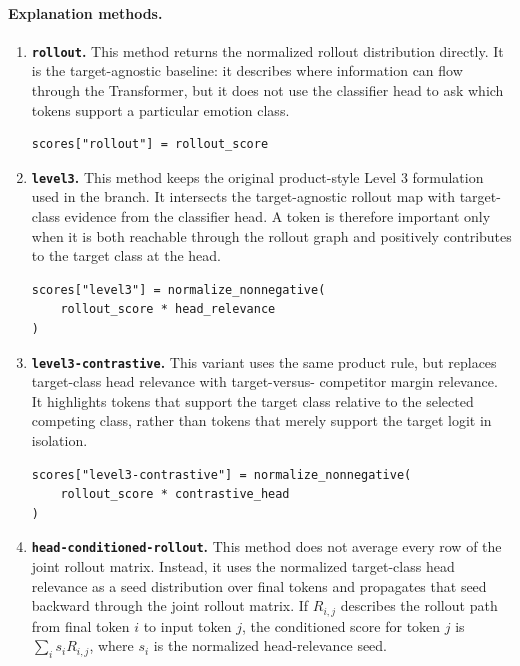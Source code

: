 \documentclass[11pt]{article}
\begin{document}
\paragraph{Explanation methods.}
\begin{enumerate}
  \item \textbf{\texttt{rollout}.} This method returns the normalized rollout
  distribution directly. It is the target-agnostic baseline: it describes where
  information can flow through the Transformer, but it does not use the
  classifier head to ask which tokens support a particular emotion class.

\begin{verbatim}
scores["rollout"] = rollout_score
\end{verbatim}

  \item \textbf{\texttt{level3}.} This method keeps the original product-style
  Level 3 formulation used in the branch. It intersects the target-agnostic
  rollout map with target-class evidence from the classifier head. A token is
  therefore important only when it is both reachable through the rollout graph
  and positively contributes to the target class at the head.

\begin{verbatim}
scores["level3"] = normalize_nonnegative(
    rollout_score * head_relevance
)
\end{verbatim}

  \item \textbf{\texttt{level3-contrastive}.} This variant uses the same
  product rule, but replaces target-class head relevance with target-versus-
  competitor margin relevance. It highlights tokens that support the target
  class relative to the selected competing class, rather than tokens that merely
  support the target logit in isolation.

\begin{verbatim}
scores["level3-contrastive"] = normalize_nonnegative(
    rollout_score * contrastive_head
)
\end{verbatim}

  \item \textbf{\texttt{head-conditioned-rollout}.} This method does not average
  every row of the joint rollout matrix. Instead, it uses the normalized
  target-class head relevance as a seed distribution over final tokens and
  propagates that seed backward through the joint rollout matrix. If
  $R_{i,j}$ describes the rollout path from final token $i$ to input token $j$,
  the conditioned score for token $j$ is
  $\sum_i s_i R_{i,j}$, where $s_i$ is the normalized head-relevance seed.


\end{enumerate}
\end{document}
